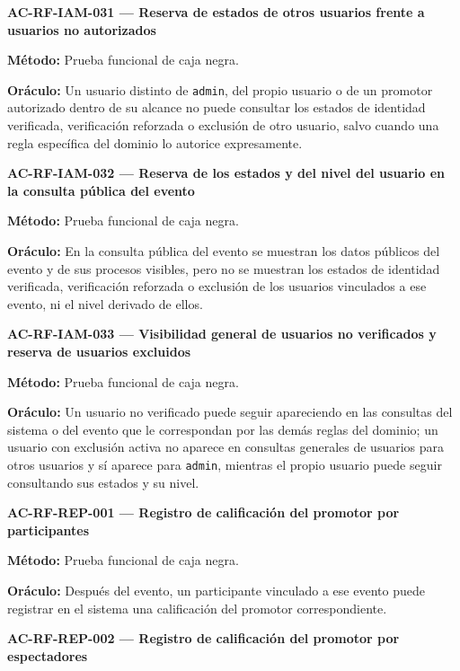 \documentclass[10pt,letterpaper]{article}
\begin{document}
\noindent\textbf{AC-RF-IAM-031 --- Reserva de estados de otros usuarios frente a usuarios no autorizados}\par
\textbf{Método:} Prueba funcional de caja negra.\par
\textbf{Oráculo:} Un usuario distinto de \texttt{admin}, del propio usuario o de un promotor autorizado dentro de su alcance no puede consultar los estados de identidad verificada, verificación reforzada o exclusión de otro usuario, salvo cuando una regla específica del dominio lo autorice expresamente.\par\vspace{0.45em}
\noindent\textbf{AC-RF-IAM-032 --- Reserva de los estados y del nivel del usuario en la consulta pública del evento}\par
\textbf{Método:} Prueba funcional de caja negra.\par
\textbf{Oráculo:} En la consulta pública del evento se muestran los datos públicos del evento y de sus procesos visibles, pero no se muestran los estados de identidad verificada, verificación reforzada o exclusión de los usuarios vinculados a ese evento, ni el nivel derivado de ellos.\par\vspace{0.45em}
\noindent\textbf{AC-RF-IAM-033 --- Visibilidad general de usuarios no verificados y reserva de usuarios excluidos}\par
\textbf{Método:} Prueba funcional de caja negra.\par
\textbf{Oráculo:} Un usuario no verificado puede seguir apareciendo en las consultas del sistema o del evento que le correspondan por las demás reglas del dominio; un usuario con exclusión activa no aparece en consultas generales de usuarios para otros usuarios y sí aparece para \texttt{admin}, mientras el propio usuario puede seguir consultando sus estados y su nivel.\par\vspace{0.45em}
\noindent\textbf{AC-RF-REP-001 --- Registro de calificación del promotor por participantes}\par
\textbf{Método:} Prueba funcional de caja negra.\par
\textbf{Oráculo:} Después del evento, un participante vinculado a ese evento puede registrar en el sistema una calificación del promotor correspondiente.\par\vspace{0.45em}
\noindent\textbf{AC-RF-REP-002 --- Registro de calificación del promotor por espectadores}\par
\end{document}
